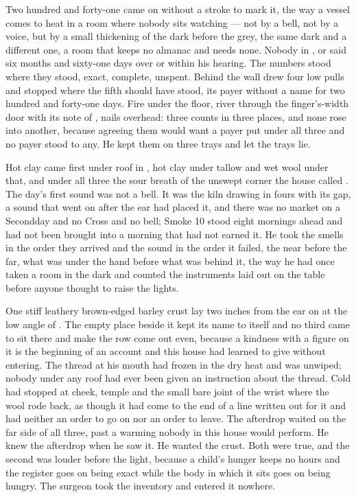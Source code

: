 
Two hundred and forty-one came on without a stroke to mark it, the way a vessel comes to heat in a room where nobody sits watching --- not by a bell, not by a voice, but by a small thickening of the dark before the grey, the same dark and a different one, a room that keeps no almanac and needs none. Nobody in ,  or  said six months and sixty-one days over  or within his hearing. The numbers stood where they stood, exact, complete, unspent. Behind the wall  drew four low pulls and stopped where the fifth should have stood, its payer without a name for two hundred and forty-one days. Fire under the floor, river through the finger's-width door with its note of , nails overhead: three counts in three places, and none rose into another, because agreeing them would want a payer put under all three and no payer stood to any. He kept them on three trays and let the trays lie.

Hot clay came first under  roof in , hot clay under tallow and wet wool under that, and under all three the sour  breath of the unswept corner the house called . The day's first sound was not a bell. It was the kiln drawing in fours with its gap, a sound that went on after the ear had placed it, and there was no market on a Secondday and no Cross and no bell; Smoke 10 stood eight mornings ahead and had not been brought into a morning that had not earned it. He took the smells in the order they arrived and the sound in the order it failed, the near before the far, what was under the hand before what was behind it, the way he had once taken a room in the dark and counted the instruments laid out on the table before anyone thought to raise the lights.

One stiff leathery brown-edged barley crust lay two inches from the ear on  at the low angle of . The empty place beside it kept its name to itself and no third came to sit there and make the row come out even, because a kindness with a figure on it is the beginning of an account and this house had learned to give without entering. The thread at his mouth had frozen in the dry heat and was unwiped; nobody under any roof had ever been given an instruction about the thread. Cold had stopped at cheek, temple and the small bare joint of the wrist where the wool rode back, as though it had come to the end of a line written out for it and had neither an order to go on nor an order to leave. The afterdrop waited on the far side of all three, past a warming nobody in this house would perform. He knew the afterdrop when he saw it. He wanted the crust. Both were true, and the second was louder before the light, because a child's hunger keeps no hours and the register goes on being exact while the body in which it sits goes on being hungry. The surgeon took the inventory and entered it nowhere.

